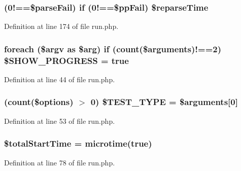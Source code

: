 \subsubsection[{\$reparse\+Time}]{ (0!==\$parse\+Fail) {\bf if} (0!==\$pp\+Fail) \$reparse\+Time}\label{run_8php_a2dc3ea8ed9b4c6f17006d0b54a806265}


Definition at line 174 of file run.\+php.

\subsubsection[{\$\+S\+H\+O\+W\+\_\+\+P\+R\+O\+G\+R\+E\+S\+S}]{\setlength{\rightskip}{0pt plus 5cm}foreach (\$argv as \$arg) {\bf if} (count(\$arguments)!==2) \$S\+H\+O\+W\+\_\+\+P\+R\+O\+G\+R\+E\+S\+S = true}\label{run_8php_afd9e85c5f1d12e54e09e03379a7ba933}


Definition at line 44 of file run.\+php.

\subsubsection[{\$\+T\+E\+S\+T\+\_\+\+T\+Y\+P\+E}]{ (count(\${\bf options}) $>$ 0) \$T\+E\+S\+T\+\_\+\+T\+Y\+P\+E = \$arguments[0]}\label{run_8php_a08d5f7af0b030bc314c9e8e4cece96de}


Definition at line 53 of file run.\+php.

\subsubsection[{\$total\+Start\+Time}]{\setlength{\rightskip}{0pt plus 5cm}\$total\+Start\+Time = microtime(true)}\label{run_8php_ac2d55b7393c9e6d196c12249952e0215}


Definition at line 78 of file run.\+php.

